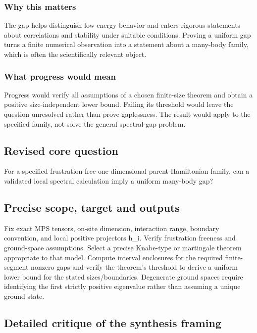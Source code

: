 \documentclass[
  11pt,
]{article}
\begin{document}
\subsubsection{Why this matters}

The gap helps distinguish low-energy behavior and enters rigorous
statements about correlations and stability under suitable conditions.
Proving a uniform gap turns a finite numerical observation into a
statement about a many-body family, which is often the scientifically
relevant object.

\subsubsection{What progress would mean}

Progress would verify all assumptions of a chosen finite-size theorem
and obtain a positive size-independent lower bound. Failing its
threshold would leave the question unresolved rather than prove
gaplessness. The result would apply to the specified family, not solve
the general spectral-gap problem.

\subsection{Revised core question}

For a specified frustration-free one-dimensional parent-Hamiltonian
family, can a validated local spectral calculation imply a uniform
many-body gap?

\subsection{Precise scope, target and outputs}

Fix exact MPS tensors, on-site dimension, interaction range, boundary
convention, and local positive projectors h\_i. Verify frustration
freeness and ground-space assumptions. Select a precise Knabe-type or
martingale theorem appropriate to that model. Compute interval
enclosures for the required finite-segment nonzero gaps and verify the
theorem's threshold to derive a uniform lower bound for the stated
sizes/boundaries. Degenerate ground spaces require identifying the first
strictly positive eigenvalue rather than assuming a unique ground state.

\subsection{Detailed critique of the synthesis framing}
\end{document}
